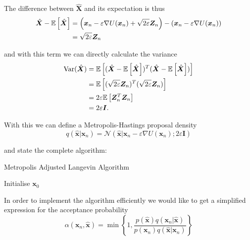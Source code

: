 The difference between $\hat{\bm{X}}$ and its expectation is thus
\[
\begin{aligned}
	\hat{\bm{X}} - \mathbb{E}\left[  \hat{\bm{X}}  \right] 
	&= \left(\bm{x}_n - \varepsilon \nabla U( \bm{x}_n ) + \sqrt{2 \varepsilon} \bm{Z}_n \right) - \left(\bm{x}_n - \varepsilon \nabla U( \bm{x}_n ) \right) \\
	&= \sqrt{2 \varepsilon} \bm{Z}_n \\
\end{aligned}
\]

and with this term we can directly calculate the variance
\[
\begin{aligned}
	\text{Var}(\hat{\bm{X}}) &= \mathbb{E}\left[  ( \hat{\bm{X}} - \mathbb{E}\left[  \hat{\bm{X}}  \right] )^T ( \hat{\bm{X}} - \mathbb{E}\left[  \hat{\bm{X}}  \right] )  \right] \\
	&= \mathbb{E}\left[  (\sqrt{2\varepsilon} \bm{Z}_n)^T (\sqrt{2 \varepsilon} \bm{Z}_n)  \right] \\
	&= 2 \varepsilon \mathbb{E}\left[  \bm{Z}_n^T \bm{Z}_n  \right] \\
	&= 2 \varepsilon \bm{I}. \\
\end{aligned}
\]

With this we can define a Metropolis-Hastings proposal density
\[
	q(\hat{\bm{x}} | \bm{x}_n) = \mathcal{N}( \hat{\bm{x}} | \bm{x}_n - \varepsilon \nabla U( \bm{x}_n ) ; 2 \varepsilon \bm{I} )
\]

and state the complete algorithm:

\NoCaptionOfAlgo
\begin{algorithm}[H]
\SetAlgoLined
\DontPrintSemicolon
{}
\SetAlCapSkip{1em}
\SetAlCapNameFnt{\normalfont\normalsize}
\caption{Metropolis Adjusted Langevin Algorithm}

Initialise $\bm{x}_0$ \;

\end{algorithm}


In order to implement the algorithm efficiently we would like to get a simplified expression for the acceptance probability
\[
	\alpha( \bm{x}_n, \hat{\bm{x}} ) 
	= \min \left \{ 1, \frac
		{ p(\hat{\bm{x}}) q( \bm{x}_n | \hat{\bm{x}} )  } 
		{ p(\bm{x}_n) q( \hat{\bm{x}} | \bm{x}_n ) }
	\right\}
\]


